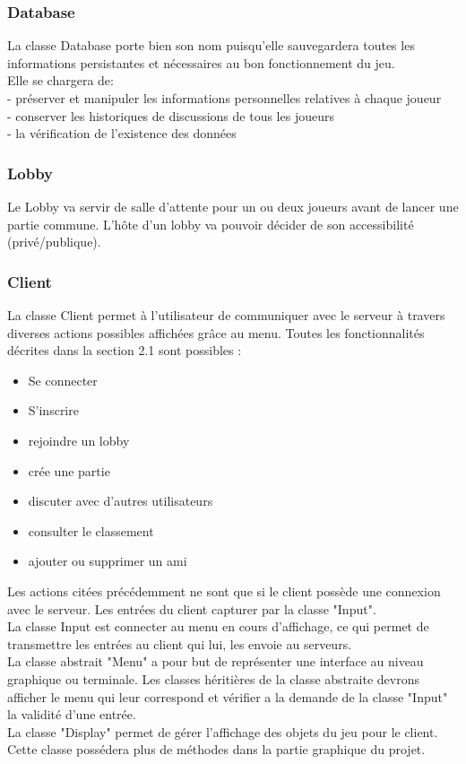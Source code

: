 \documentclass[a4paper,12pt]{article}
\begin{document}
\subsubsection{Database}
La classe Database porte bien son nom puisqu'elle sauvegardera toutes les informations persistantes et nécessaires au bon fonctionnement du jeu.\\
Elle se chargera de:\\
- préserver et manipuler les informations personnelles relatives à chaque joueur\\
- conserver les historiques de discussions de tous les joueurs\\
- la vérification de l'existence des données
\subsubsection{Lobby}
Le Lobby va servir de salle d'attente pour un ou deux joueurs avant de lancer une partie commune. L'hôte d'un lobby va pouvoir décider de son accessibilité (privé/publique).

\subsubsection{Client}
La classe Client permet à l'utilisateur de communiquer avec le serveur à travers diverses actions possibles affichées grâce au menu.
Toutes les fonctionnalités décrites dans la section 2.1 sont possibles :
\begin{itemize}
    \item Se connecter
    \item S'inscrire
    \item rejoindre un lobby
    \item crée une partie
    \item discuter avec d'autres utilisateurs
    \item consulter le classement
    \item ajouter ou supprimer un ami
\end{itemize}

Les actions citées précédemment ne sont que si le client possède une connexion avec le serveur. Les entrées du client capturer par la classe "Input".\\
La classe Input est connecter au menu en cours d'affichage, ce qui permet de transmettre les entrées au client qui lui, les envoie au serveurs.\\
La classe abstrait "Menu" a pour but de représenter une interface au niveau graphique ou terminale. Les classes héritières de la classe abstraite devrons afficher le menu qui leur correspond et vérifier a la demande de la classe "Input" la validité d'une entrée.\\
La classe "Display" permet de gérer l'affichage des objets du jeu pour le client. Cette classe possédera plus de méthodes dans la partie graphique du projet. 
\end{document}
